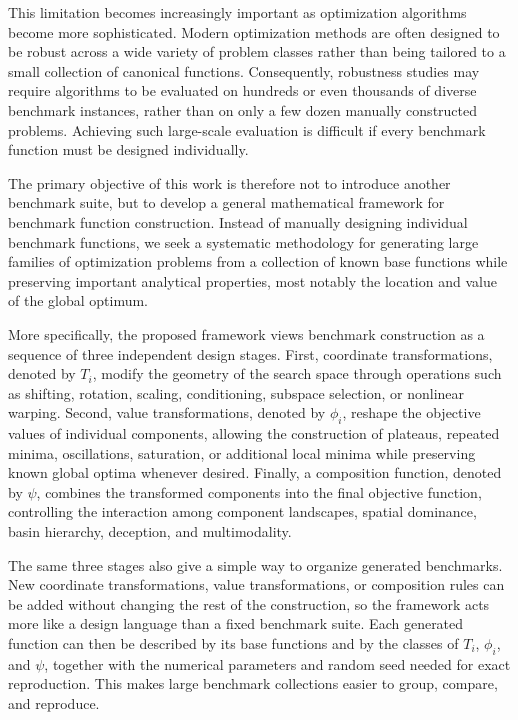 \documentclass[journal]{IEEEtran}
\theoremstyle{remark}
\theoremstyle{plain}
\begin{document}
This limitation becomes increasingly important as optimization algorithms become
more sophisticated. Modern optimization methods are often designed to be robust
across a wide variety of problem classes rather than being tailored to a small
collection of canonical functions. Consequently, robustness studies may require
algorithms to be evaluated on hundreds or even thousands of diverse benchmark
instances, rather than on only a few dozen manually constructed problems.
Achieving such large-scale evaluation is difficult if every benchmark function
must be designed individually.

The primary objective of this work is therefore not to introduce another
benchmark suite, but to develop a general mathematical framework for benchmark
function construction. Instead of manually designing individual benchmark
functions, we seek a systematic methodology for generating large families of
optimization problems from a collection of known base functions while preserving
important analytical properties, most notably the location and value of the
global optimum.

More specifically, the proposed framework views benchmark construction as a
sequence of three independent design stages. First, coordinate transformations,
denoted by \(T_i\), modify the geometry of the search space through operations
such as shifting, rotation, scaling, conditioning, subspace selection, or
nonlinear warping. Second, value transformations, denoted by \(\phi_i\),
reshape the objective values of individual components, allowing the construction
of plateaus, repeated minima, oscillations, saturation, or additional local
minima while preserving known global optima whenever desired. Finally, a
composition function, denoted by \(\psi\), combines the transformed components
into the final objective function, controlling the interaction among component
landscapes, spatial dominance, basin hierarchy, deception, and multimodality.


The same three stages also give a simple way to organize generated
benchmarks. New coordinate transformations, value transformations, or
composition rules can be added without changing the rest of the construction,
so the framework acts more like a design language than a fixed benchmark
suite. Each generated function can then be described by its base functions and
by the classes of \(T_i\), \(\phi_i\), and \(\psi\), together with the
numerical parameters and random seed needed for exact reproduction. This makes
large benchmark collections easier to group, compare, and reproduce.
\end{document}
